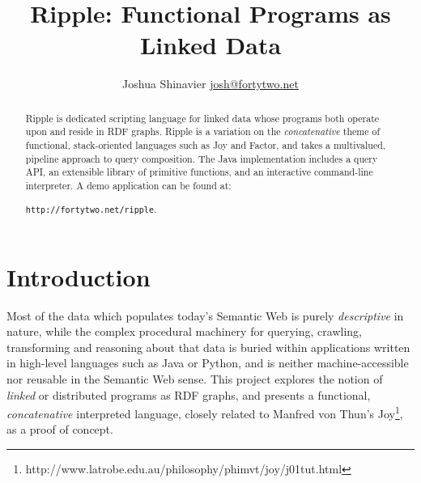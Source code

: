 \documentclass[runningheads]{llncs}
\begin{document}
\mainmatter  %


\title{Ripple: Functional Programs as Linked Data}


%
%
\author{
Joshua Shinavier
\newline
\url{josh@fortytwo.net}}
%


%
%

\maketitle

\begin{abstract}
Ripple is dedicated scripting language for linked data whose programs both operate upon and reside in RDF graphs.  Ripple is a variation on the \textit{concatenative} theme of functional, stack-oriented languages such as Joy and Factor, and takes a multivalued, pipeline approach to query composition.  The Java implementation includes a query API, an extensible library of primitive functions, and an interactive command-line interpreter.  A demo application can be found at:

\indent \texttt{http://fortytwo.net/ripple}.
\end{abstract}

\section{Introduction}
Most of the data which populates today's Semantic Web is purely \textit{descriptive} in nature, while the complex procedural machinery for querying, crawling, transforming and reasoning about that data is buried within applications written in high-level languages such as Java or Python, and is neither machine-accessible nor reusable in the Semantic Web sense.  This project explores the notion of \textit{linked} or distributed programs as RDF graphs, and presents a functional, \textit{concatenative} interpreted language, closely related to Manfred von Thun's Joy\footnote{http://www.latrobe.edu.au/philosophy/phimvt/joy/j01tut.html}, as a proof of concept.
\end{document}

